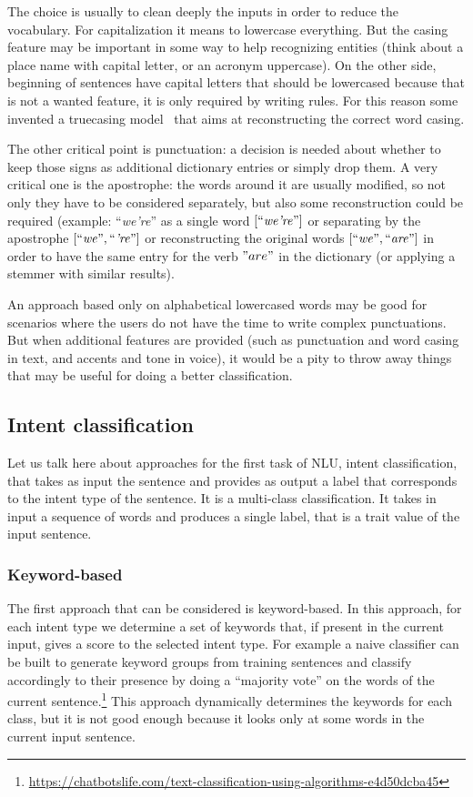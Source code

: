 The choice is usually to clean deeply the inputs in order to reduce the vocabulary. For capitalization it means to lowercase everything. But the casing feature may be important in some way to help recognizing entities (think about a place name with capital letter, or an acronym uppercase). On the other side, beginning of sentences have capital letters that should be lowercased because that is not a wanted feature, it is only required by writing rules. For this reason some invented a truecasing model~\cite{lita2003truecasing} that aims at reconstructing the correct word casing.

The other critical point is punctuation: a decision is needed about whether to keep those signs as additional dictionary entries or simply drop them. A very critical one is the apostrophe: the words around it are usually modified, so not only they have to be considered separately, but also some reconstruction could be required (example: ``\textit{we're}''  as a single word $\left[\text{``\textit{we're}''} \right]$  or separating by the apostrophe $\left[\text{``\textit{we}''}, \text{``\textit{'re}''}\right]$ or reconstructing the original words $\left[ \text{``\textit{we}''}, \text{``\textit{are}''} \right]$ in order to have the same entry for the verb  \( "are" \) in the dictionary (or applying a stemmer with similar results).

An approach based only on alphabetical lowercased words may be good for scenarios where the users do not have the time to write complex punctuations. But when additional features are provided (such as punctuation and word casing in text, and accents and tone in voice), it would be a pity to throw away things that may be useful for doing a better classification.

\subsection{Intent classification}
\label{soaIntent}

Let us talk here about approaches for the first task of NLU, intent classification, that takes as input the sentence and provides as output a label that corresponds to the intent type of the sentence. It is a multi-class classification. It takes in input a sequence of words and produces a single label, that is a trait value of the input sentence.

\subsubsection{Keyword-based}
The first approach that can be considered is keyword-based. In this approach, for each intent type we determine a set of keywords that, if present in the current input, gives a score to the selected intent type. For example a naive classifier can be built to generate keyword groups from training sentences and classify accordingly to their presence by doing a ``majority vote'' on the words of the current sentence.\footnote{\url{https://chatbotslife.com/text-classification-using-algorithms-e4d50dcba45}} This approach dynamically determines the keywords for each class, but it is not good enough because it looks only at some words in the current input sentence.

